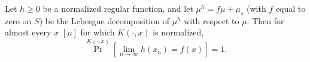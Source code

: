 Let $h \geq 0$ be a normalized regular function, and let $\mu^h = f \mu + \mu_s$ (with $f$ equal to zero on $S$) be the Lebesgue decomposition of $\mu^h$ with respect to $\mu$. Then for almost every $x$ $[\mu]$ for which $K(\cdot, x)$ is normalized,
$$\Pr^{K(\cdot, x)}\left[\lim_{n \to \infty} h(x_n) = f(x)\right] = 1.$$
